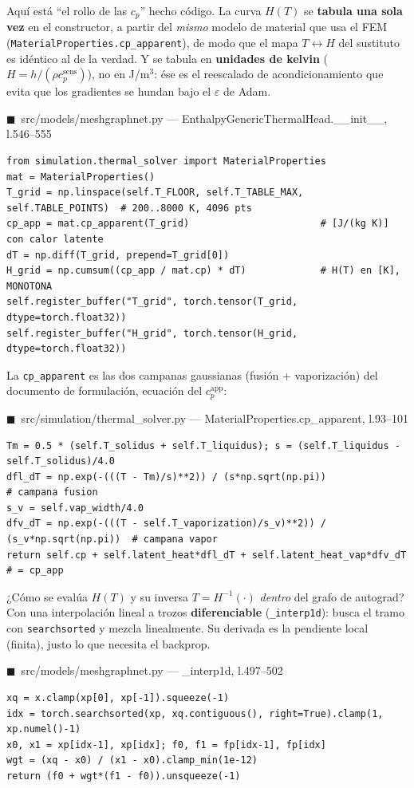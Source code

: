 \documentclass[11pt]{article}
\newcommand{\cpapp}{c_p^{\mathrm{app}}}
\newcommand{\cpsens}{c_p^{\mathrm{sens}}}
\theoremstyle{definition}
\theoremstyle{plain}
\newcommand{\srcref}[1]{\par\smallskip\noindent
  {\footnotesize\ttfamily\textcolor{srcblue}{$\blacksquare$\ #1}}\par\vspace{1pt}}
\begin{document}
Aquí está ``el rollo de las $c_p$'' hecho código. La curva $H(T)$ se \textbf{tabula
una sola vez} en el constructor, a partir del \emph{mismo} modelo de material que usa
el FEM (\texttt{MaterialProperties.cp\_apparent}), de modo que el mapa $T\leftrightarrow
H$ del sustituto es idéntico al de la verdad. Y se tabula en \textbf{unidades de
kelvin} ($H=h/(\rho\cpsens)$), no en J/m$^3$: ése es el reescalado de
acondicionamiento que evita que los gradientes se hundan bajo el $\varepsilon$ de Adam.

\srcref{src/models/meshgraphnet.py — EnthalpyGenericThermalHead.\_\_init\_\_, l.546--555}
\begin{lstlisting}
from simulation.thermal_solver import MaterialProperties
mat = MaterialProperties()
T_grid = np.linspace(self.T_FLOOR, self.T_TABLE_MAX, self.TABLE_POINTS)  # 200..8000 K, 4096 pts
cp_app = mat.cp_apparent(T_grid)                       # [J/(kg K)] con calor latente
dT = np.diff(T_grid, prepend=T_grid[0])
H_grid = np.cumsum((cp_app / mat.cp) * dT)             # H(T) en [K], MONOTONA
self.register_buffer("T_grid", torch.tensor(T_grid, dtype=torch.float32))
self.register_buffer("H_grid", torch.tensor(H_grid, dtype=torch.float32))
\end{lstlisting}

La \texttt{cp\_apparent} es las dos campanas gaussianas (fusión + vaporización) del
documento de formulación, ecuación del $\cpapp$:

\srcref{src/simulation/thermal\_solver.py — MaterialProperties.cp\_apparent, l.93--101}
\begin{lstlisting}
Tm = 0.5 * (self.T_solidus + self.T_liquidus); s = (self.T_liquidus - self.T_solidus)/4.0
dfl_dT = np.exp(-(((T - Tm)/s)**2)) / (s*np.sqrt(np.pi))                # campana fusion
s_v = self.vap_width/4.0
dfv_dT = np.exp(-(((T - self.T_vaporization)/s_v)**2)) / (s_v*np.sqrt(np.pi))  # campana vapor
return self.cp + self.latent_heat*dfl_dT + self.latent_heat_vap*dfv_dT  # = cp_app
\end{lstlisting}

¿Cómo se evalúa $H(T)$ y su inversa $T=H^{-1}(\cdot)$ \emph{dentro} del grafo de
autograd? Con una interpolación lineal a trozos \textbf{diferenciable}
(\texttt{\_interp1d}): busca el tramo con \texttt{searchsorted} y mezcla linealmente.
Su derivada es la pendiente local (finita), justo lo que necesita el backprop.

\srcref{src/models/meshgraphnet.py — \_interp1d, l.497--502}
\begin{lstlisting}
xq = x.clamp(xp[0], xp[-1]).squeeze(-1)
idx = torch.searchsorted(xp, xq.contiguous(), right=True).clamp(1, xp.numel()-1)
x0, x1 = xp[idx-1], xp[idx]; f0, f1 = fp[idx-1], fp[idx]
wgt = (xq - x0) / (x1 - x0).clamp_min(1e-12)
return (f0 + wgt*(f1 - f0)).unsqueeze(-1)
\end{lstlisting}
\end{document}
